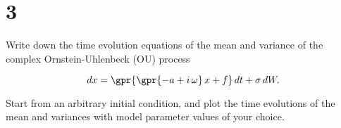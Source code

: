 \section{3}

Write down the time evolution equations of the mean and variance of the complex Ornstein-Uhlenbeck (OU) process

\begin{equation}
	dx = \gpr{\gpr{-a + i\,\omega}\,x + f}\,dt + \sigma\,dW.
\end{equation}

Start from an arbitrary initial condition, and plot the time evolutions of the mean and variances with model parameter values of your choice.

